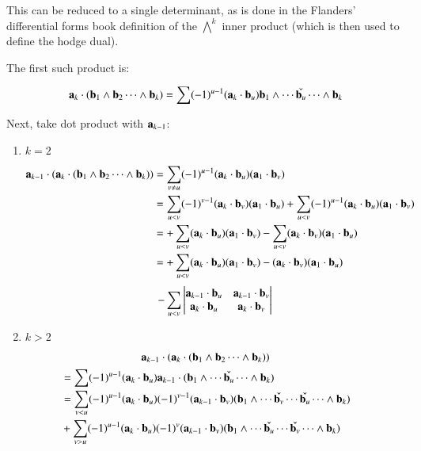 \documentclass{article}      %
\begin{document}
This can be reduced to a single determinant, as is done in
the Flanders' differential forms book definition of the 
${\bigwedge}^k$ inner product (which is then used to define the hodge dual).

The first such product is:

\[
\mathbf{a}_k \cdot (\mathbf{b}_1 \wedge \mathbf{b}_2 \cdots \wedge \mathbf{b}_k)
= \sum (-1)^{u-1} (\mathbf{a}_k \cdot \mathbf{b}_u) \mathbf{b}_1 \wedge \cdots \check{\mathbf{b}_u} \cdots \wedge \mathbf{b}_k
\]

Next, take dot product with $\mathbf{a}_{k-1}$:

\begin{enumerate}
\item $k=2$

\begin{align*}
\mathbf{a}_{k-1} \cdot (\mathbf{a}_k \cdot (\mathbf{b}_1 \wedge \mathbf{b}_2 \cdots \wedge \mathbf{b}_k))
&= \sum_{v \ne u} (-1)^{u-1} (\mathbf{a}_k \cdot \mathbf{b}_u) (\mathbf{a}_1 \cdot \mathbf{b}_v) \\
&= 
 \sum_{u < v} (-1)^{v-1} (\mathbf{a}_k \cdot \mathbf{b}_v) (\mathbf{a}_1 \cdot \mathbf{b}_u) 
+\sum_{u < v} (-1)^{u-1} (\mathbf{a}_k \cdot \mathbf{b}_u) (\mathbf{a}_1 \cdot \mathbf{b}_v) \\
&= 
+\sum_{u < v} (\mathbf{a}_k \cdot \mathbf{b}_u) (\mathbf{a}_1 \cdot \mathbf{b}_v) 
-\sum_{u < v} (\mathbf{a}_k \cdot \mathbf{b}_v) (\mathbf{a}_1 \cdot \mathbf{b}_u) \\
&= 
+\sum_{u< v} (\mathbf{a}_k \cdot \mathbf{b}_u) (\mathbf{a}_1 \cdot \mathbf{b}_v) 
- (\mathbf{a}_k \cdot \mathbf{b}_v) (\mathbf{a}_1 \cdot \mathbf{b}_u) \\
\end{align*}
\begin{equation}\label{eqn:k2dot}
-\sum_{u< v}
\begin{vmatrix}
\mathbf{a}_{k-1} \cdot \mathbf{b}_u & \mathbf{a}_{k-1} \cdot \mathbf{b}_v \\
\mathbf{a}_k \cdot \mathbf{b}_u & \mathbf{a}_k \cdot \mathbf{b}_v \\
\end{vmatrix}
\end{equation}

\item $k>2$
\end{enumerate}

\[
\mathbf{a}_{k-1} \cdot (\mathbf{a}_k \cdot (\mathbf{b}_1 \wedge \mathbf{b}_2 \cdots \wedge \mathbf{b}_k))
\]
\begin{align*}
&= \sum (-1)^{u-1} (\mathbf{a}_k \cdot \mathbf{b}_u) \mathbf{a}_{k-1} \cdot (\mathbf{b}_1 \wedge \cdots \check{\mathbf{b}_u} \cdots \wedge \mathbf{b}_k) \\
&= \sum_{v<u} (-1)^{u-1} (\mathbf{a}_k \cdot \mathbf{b}_u) (-1)^{v-1} (\mathbf{a}_{k-1} \cdot \mathbf{b}_v) (\mathbf{b}_1 \wedge \cdots \check{\mathbf{b}_v} \cdots \check{\mathbf{b}_u} \cdots \wedge \mathbf{b}_k) \\
&+ \sum_{v>u} (-1)^{u-1} (\mathbf{a}_k \cdot \mathbf{b}_u) (-1)^{v} (\mathbf{a}_{k-1} \cdot \mathbf{b}_v) (\mathbf{b}_1 \wedge \cdots \check{\mathbf{b}_u} \cdots \check{\mathbf{b}_v} \cdots \wedge \mathbf{b}_k) \\
\end{align*}
\end{document}
